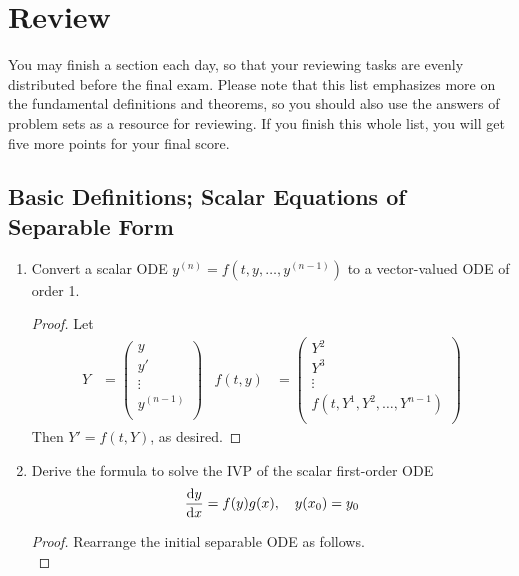 \documentclass[../psets.tex]{subfiles}
\begin{document}
\section{Review}
You may finish a section each day, so that your reviewing tasks are evenly distributed before the final exam. Please note that this list emphasizes more on the fundamental definitions and theorems, so you should also use the answers of problem sets as a resource for reviewing. If you finish this whole list, you will get five more points for your final score.


\subsection*{Basic Definitions; Scalar Equations of Separable Form}
\begin{enumerate}
    \item Convert a scalar ODE $y^{(n)}=f(t,y,\dots,y^{(n-1)})$ to a vector-valued ODE of order 1.
    \begin{proof}
        Let
        \begin{align*}
            Y &=
            \begin{pmatrix}
                y\\
                y'\\
                \vdots\\
                y^{(n-1)}\\
            \end{pmatrix}&
            f(t,y) &=
            \begin{pmatrix}
                Y^2\\
                Y^3\\
                \vdots\\
                f(t,Y^1,Y^2,\dots,Y^{n-1})\\
            \end{pmatrix}
        \end{align*}
        Then $Y'=f(t,Y)$, as desired.
    \end{proof}
    \item Derive the formula to solve the IVP of the scalar first-order ODE
    \begin{equation*}
        \dv{y}{x} = f(y)g(x)
        ,\quad
        y(x_0) = y_0
    \end{equation*}
    \begin{proof}
        Rearrange the initial separable ODE as follows.
        \begin{equation*}

\end{equation*}
\end{proof}
\end{enumerate}
\end{document}
